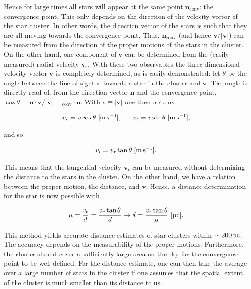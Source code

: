 \documentclass[a4paper,10pt]{article}
\begin{document}
{\noindent}Hence for large times all stars will appear at the same point $\mathbf{n}_\mathrm{conv}$: the convergence point. This only depends on the direction of the velocity vector of the star cluster. In other words, the direction vector of the stars is such that they are all moving towards the convergence point. Thus, $\mathbf{n}_\mathrm{conv}$ (and hence $\mathbf{v}/\lvert\mathbf{v}\rvert$) can be measured from the direction of the proper motions of the stars in the cluster. On the other hand, one component of $\mathbf{v}$ can be determined from the (easily measured) radial velocity $\mathbf{v}_r$. With these two observables the three-dimensional velocity vector $\mathbf{v}$ is completely determined, as is easily demonstrated: let $\theta$ be the angle between the line-of-sight $\mathbf{n}$ towards a star in the cluster and $\mathbf{v}$. The angle is directly read off from the direction vector $\mathbf{n}$ and the convergence point, $\cos\theta = \mathbf{n}\cdot\mathbf{v}/\lvert\mathbf{v}\rvert = \mathbf{}_\mathrm{conv}\cdot\mathbf{n}$. With $v\equiv\lvert\mathbf{v}\rvert$ one then obtains

\begin{align*}
    v_r = v\cos\theta ~ [{\rm m\,s^{-1}}], ~~~~~ v_t = v\sin\theta ~ [{\rm m\,s^{-1}}],
\end{align*}

{\noindent}and so

\begin{align*}
    v_t = v_r\tan\theta ~ [{\rm m\,s^{-1}}].
\end{align*}

{\noindent}This means that the tangential velocity $\mathbf{v}_t$ can be measured without determining the distance to the stars in the cluster. On the other hand, we have a relation between the proper motion, the distance, and $\mathbf{v}$. Hence, a distance determination for the star is now possible with

\begin{align*}
    \mu = \frac{v_t}{d} = \frac{v_r\tan\theta}{d} \rightarrow d = \frac{v_r\tan\theta}{\mu} ~ [{\rm pc}].
\end{align*}

{\noindent}This method yields accurate distance estimates of star clusters within $\sim200\,{\rm pc}$. The accuracy depends on the measurability of the proper motions. Furthermore, the cluster should cover a sufficiently large area on the sky for the convergence point to be well defined. For the distance estimate, one can then take the average over a large number of stars in the cluster if one assumes that the spatial extent of the cluster is much smaller than its distance to us.
\end{document}
